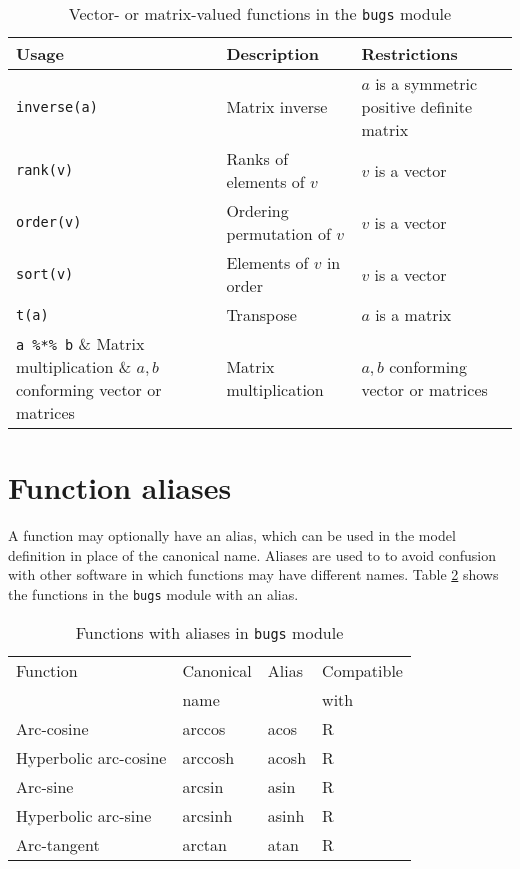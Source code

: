 \documentclass[11pt, a4paper, titlepage]{report}
\begin{document}
\begin{table}
\begin{center}
\begin{tabular}{lll}
\hline
Usage & Description & Restrictions \\
\hline
\verb+inverse(a)+ & Matrix inverse & $a$ is a symmetric positive definite matrix  \\
\verb+rank(v)+ & Ranks of elements of $v$ & $v$ is a vector   \\
\verb+order(v)+ & Ordering permutation of $v$ & $v$ is a vector \\
\verb+sort(v)+ & Elements of $v$ in order & $v$ is a vector  \\
\verb+t(a)+    & Transpose                & $a$ is a matrix \\
\verb+a %*% b+  & Matrix multiplication & $a,b$ conforming vector or matrices\\

\hline
\end{tabular}
\caption{Vector- or matrix-valued functions in the \texttt{bugs}
  module \label{table:bugs:vector}}
\end{center}
\end{table}

\section{Function aliases}

A function may optionally have an alias, which can be used in the
model definition in place of the canonical name. Aliases are used to
to avoid confusion with other software in which functions may have
different names. Table \ref{table:bugs:functions:alias} shows the
functions in the \texttt{bugs} module with an alias.

\begin{table}
\begin{center}
\begin{tabular}{llll}
\hline
Function               & Canonical & Alias & Compatible  \\
                       & name      &       & with         \\
\hline
Arc-cosine             & arccos    & acos  & R \\
Hyperbolic arc-cosine  & arccosh   & acosh & R \\
Arc-sine               & arcsin    & asin  & R \\
Hyperbolic arc-sine    & arcsinh   & asinh & R \\
Arc-tangent            & arctan    & atan  & R \\
\hline
\end{tabular}
\caption{Functions with aliases in \texttt{bugs} module
  \label{table:bugs:functions:alias}}
\end{center}
\end{table}
\end{document}
